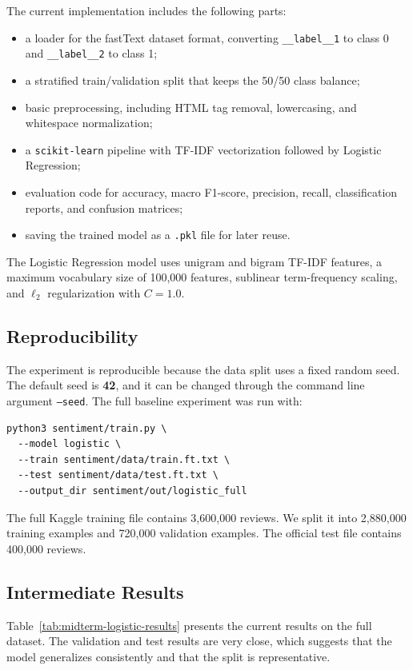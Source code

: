 \documentclass{article}
\begin{document}
The current implementation includes the following parts:
\begin{itemize}
  \item a loader for the fastText dataset format, converting
  \texttt{\_\_label\_\_1} to class 0 and \texttt{\_\_label\_\_2} to class 1;
  \item a stratified train/validation split that keeps the 50/50 class balance;
  \item basic preprocessing, including HTML tag removal, lowercasing, and
  whitespace normalization;
  \item a \texttt{scikit-learn} pipeline with TF-IDF vectorization followed by
  Logistic Regression;
  \item evaluation code for accuracy, macro F1-score, precision, recall,
  classification reports, and confusion matrices;
  \item saving the trained model as a \texttt{.pkl} file for later reuse.
\end{itemize}

The Logistic Regression model uses unigram and bigram TF-IDF features, a maximum
vocabulary size of 100,000 features, sublinear term-frequency scaling, and
$\ell_2$ regularization with $C=1.0$.

\subsection{Reproducibility}
The experiment is reproducible because the data split uses a fixed random seed.
The default seed is \textbf{42}, and it can be changed through the command line
argument \texttt{--seed}. The full baseline experiment was run with:

\begin{verbatim}
python3 sentiment/train.py \
  --model logistic \
  --train sentiment/data/train.ft.txt \
  --test sentiment/data/test.ft.txt \
  --output_dir sentiment/out/logistic_full
\end{verbatim}

The full Kaggle training file contains 3,600,000 reviews. We split it into
2,880,000 training examples and 720,000 validation examples. The official test
file contains 400,000 reviews.

\subsection{Intermediate Results}
Table~\ref{tab:midterm-logistic-results} presents the current results on the
full dataset. The validation and test results are very close, which suggests
that the model generalizes consistently and that the split is representative.
\end{document}
